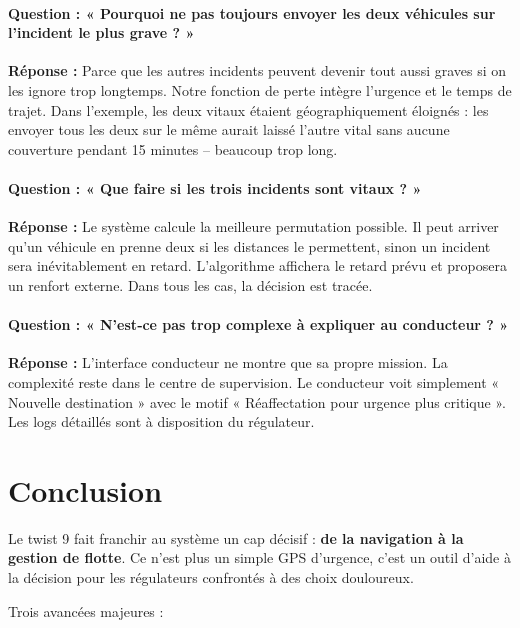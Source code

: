 \documentclass[12pt,a4paper]{article}
\theoremstyle{definition}
\theoremstyle{remark}
\begin{document}
\paragraph{Question : « Pourquoi ne pas toujours envoyer les deux
véhicules sur l’incident le plus grave ? »}
\textbf{Réponse :} Parce que les autres incidents peuvent devenir
tout aussi graves si on les ignore trop longtemps. Notre fonction
de perte intègre l’urgence et le temps de trajet. Dans l’exemple,
les deux vitaux étaient géographiquement éloignés : les envoyer
tous les deux sur le même aurait laissé l’autre vital sans aucune
couverture pendant 15 minutes – beaucoup trop long.

\paragraph{Question : « Que faire si les trois incidents sont vitaux ? »}
\textbf{Réponse :} Le système calcule la meilleure permutation
possible. Il peut arriver qu’un véhicule en prenne deux si les
distances le permettent, sinon un incident sera inévitablement
en retard. L’algorithme affichera le retard prévu et proposera
un renfort externe. Dans tous les cas, la décision est tracée.

\paragraph{Question : « N’est‑ce pas trop complexe à expliquer
au conducteur ? »}
\textbf{Réponse :} L’interface conducteur ne montre que sa propre
mission. La complexité reste dans le centre de supervision.
Le conducteur voit simplement « Nouvelle destination » avec le
motif « Réaffectation pour urgence plus critique ». Les logs
détaillés sont à disposition du régulateur.

\newpage

\section*{Conclusion}

Le twist 9 fait franchir au système un cap décisif : \textbf{de la
navigation à la gestion de flotte}. Ce n’est plus un simple GPS
d’urgence, c’est un outil d’aide à la décision pour les régulateurs
confrontés à des choix douloureux.

\medskip
Trois avancées majeures :
\end{document}

